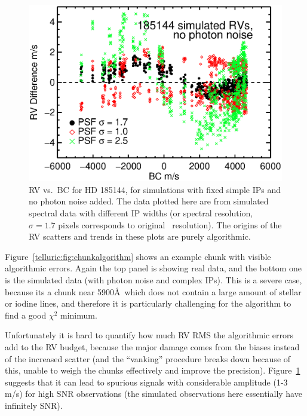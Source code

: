 \begin{figure}
\centering
\includegraphics[scale=0.65]{telluric/185144-rv-bc-rja01-rje01-rjf01.eps} 
\caption{RV vs.\ BC for HD 185144, for simulations with fixed simple
IPs and no photon noise added. The data plotted here are from
simulated spectral data with different IP widths (or spectral
resolution, $\sigma=1.7$ pixels corresponds to original \keck\
resolution). The origins of the RV scatters and trends in these plots
are purely algorithmic.
\label{keck:fig:algorithm}}
\end{figure}

Figure~\ref{telluric:fig:chunkalgorithm} shows an example chunk with
visible algorithmic errors. Again the top panel is showing real data,
and the bottom one is the simulated data (with photon noise and
complex IPs). This is a severe case, because its a chunk near 5900\AA\
which does not contain a large amount of stellar or iodine lines, and
therefore it is particularly challenging for the algorithm to find a
good $\chi^2$ minimum.

Unfortunately it is hard to quantify how much RV RMS the algorithmic
errors add to the RV budget, because the major damage comes from the
biases instead of the increased scatter (and the ``vanking'' procedure
breaks down because of this, unable to weigh the chunks effectively
and improve the precision). Figure~\ref{keck:fig:algorithm} suggests
that it can lead to spurious signals with considerable amplitude (1-3
m/s) for high SNR observations (the simulated observations here
essentially have infinitely SNR).


